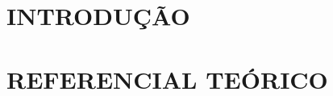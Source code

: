 \documentclass[
        oneside,      %
        english,			
        brazil			 
        ]{configcefetmglpd}
\begin{document}

\cleardoublepage


 \listoftables*   

\cleardoublepage



 



 
\tableofcontents*
\cleardoublepage


\textual %


\chapter{INTRODUÇÃO}
\label{cap:introducao_modelo}


\chapter{REFERENCIAL TEÓRICO} \label{cap:referencial}

\end{document}

